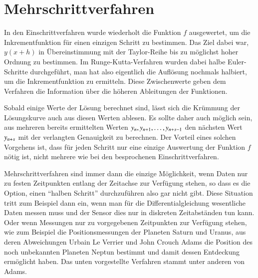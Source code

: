 %
%
%
\section{Mehrschrittverfahren}
In den Einschrittverfahren wurde wiederholt die Funktion $f$ ausgewertet,
um die Inkrementfunk\-tion für einen einzigen Schritt zu bestimmen.
%
%
Das Ziel dabei war, $y(x+h)$ in Übereinstimmung mit der Taylor-Reihe
bis zu möglichst hoher Ordnung zu bestimmen.
%
Im Runge-Kutta-Verfahren wurden dabei halbe Euler-Schritte durchgeführt,
man hat also eigentlich die Auflösung nochmals halbiert, um die
Inkrementfunktion zu ermitteln.
%
Diese Zwischenwerte geben dem Verfahren die Information über die
höheren Ableitungen der Funktionen.

Sobald einige Werte der Lösung berechnet sind, lässt sich die Krümmung
der Lösungskurve auch aus diesen Werten ablesen.
Es sollte daher auch möglich sein, aus mehreren bereits
ermittelten Werten $y_{n\mathstrut},y_{n+1},\dots,y_{n+s-1}$
den nächsten Wert $y_{n+s\mathstrut}$ mit der verlangten Genauigkeit
zu berechnen.
Der Vorteil eines solchen Vorgehens ist, dass für jeden Schritt nur 
eine einzige Auswertung der Funktion $f$ nötig ist,
nicht mehrere wie bei den besprochenen Einschrittverfahren.

Mehrschrittverfahren sind immer dann die einzige Möglichkeit, wenn Daten
nur zu festen Zeitpunkten entlang der Zeitachse zur Verfügung stehen,
so dass es die Option, einen ``halben Schritt'' durchzuführen also gar
nicht gibt.
Diese Situation tritt zum Beispiel dann ein, wenn man für die
Differentialgleichung wesentliche Daten messen muss und der
Sensor dies nur in diskreten Zeitabständen tun kann.
Oder wenn Messungen nur zu vorgegebenen Zeitpunkten zur Verfügung
stehen, wie zum Beispiel die Positionsmessungen der Planeten Saturn
%
und Uranus, aus deren Abweichungen Urbain Le Verrier und
%
%
John Crouch Adams die Position des noch unbekannten Planeten Neptun
%
%
bestimmt und damit dessen Entdeckung ermöglicht haben.
Das unten vorgestellte Verfahren stammt unter anderen von Adams.

